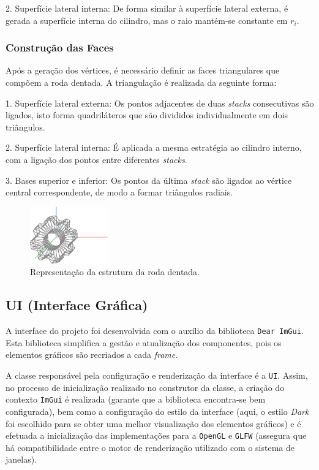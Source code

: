 \documentclass[12pt, a4paper]{article}
\begin{document}
2. Superfície lateral interna: De forma similar à superfície lateral externa, é gerada a superfície
interna do cilindro, mas o raio mantém-se constante em $r_i$.

\subsubsection{Construção das Faces}

Após a geração dos vértices, é necessário definir as faces triangulares que compõem a roda dentada.
A triangulação é realizada da seguinte forma:

1. Superfície lateral externa: Os pontos adjacentes de duas \emph{stacks} consecutivas são
ligados, isto forma quadriláteros que são divididos individualmente em dois triângulos.

2. Superfície lateral interna: É aplicada a mesma estratégia ao cilindro interno, com a ligação
dos pontos entre diferentes \emph{stacks}.

3. Bases superior e inferior: Os pontos da última \emph{stack} são ligados ao vértice central
correspondente, de modo a formar triângulos radiais.

\begin{figure}[H]
    \centering
    \includegraphics[width=0.3\textwidth]{res/phase2/figures/gear.pdf}
    \caption{Representação da estrutura da roda dentada.}
\end{figure}

\subsection{UI (Interface Gráfica)}

A interface do projeto foi desenvolvida com o auxílio da biblioteca \texttt{Dear ImGui}. Esta
biblioteca simplifica a gestão e atualização dos componentes, pois os elementos gráficos são
recriados a cada \textit{frame}.

A classe responsável pela configuração e renderização da interface é a \texttt{UI}.
Assim, no processo de inicialização realizado no construtor da classe, a criação do contexto
\texttt{ImGui} é realizada (garante que a biblioteca encontra-se bem configurada), bem como a
configuração do estilo da interface (aqui, o estilo \textit{Dark} foi escolhido para se obter uma
melhor visualização dos elementos gráficos) e é efetuada a inicialização das implementações para a
\texttt{OpenGL} e \texttt{GLFW} (assegura que há compatibilidade entre o motor de renderização
utilizado com o sistema de janelas).
\end{document}
